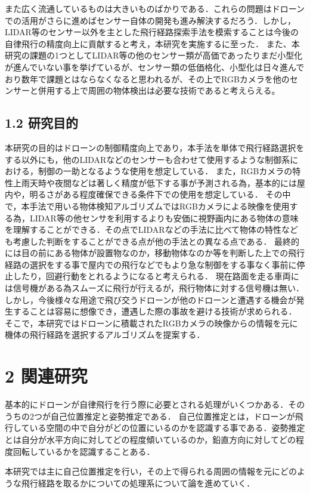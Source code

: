 \documentclass[a4j,10pt]{jsarticle}
\begin{document}
また広く流通しているものは大きいものばかりである．これらの問題はドローンでの活用がさらに進めばセンサー自体の開発も進み解決するだろう．しかし，LIDAR等のセンサー以外を主とした飛行経路探索手法を模索することは今後の自律飛行の精度向上に貢献すると考え，本研究を実施するに至った．
また、本研究の課題の1つとしてLIDAR等の他のセンサー類が高価であったりまだ小型化が進んでいない事を挙げているが、センサー類の低価格化、小型化は日々進んでおり数年で課題とはならなくなると思われるが、その上でRGBカメラを他のセンサーと併用する上で周囲の物体検出は必要な技術であると考えらえる。


\subsection{1.2 研究目的}
本研究の目的はドローンの制御精度向上であり，本手法を単体で飛行経路選択をする以外にも，他のLIDARなどのセンサーも合わせて使用するような制御系における，制御の一助となるような使用を想定している．
また，RGBカメラの特性上雨天時や夜間などは著しく精度が低下する事が予測される為，基本的には屋内や，明るさがある程度確保できる条件下での使用を想定している．
その中で，本手法で用いる物体検知アルゴリズムではRGBカメラによる映像を使用する為，LIDAR等の他センサを利用するよりも安価に視野画内にある物体の意味を理解することができる．その点でLIDARなどの手法に比べて物体の特性なども考慮した判断をすることができる点が他の手法との異なる点である．
最終的には目の前にある物体が設置物なのか，移動物体なのか等を判断した上での飛行経路の選択をする事で屋内での飛行などでもより急な制御をする事なく事前に停止したり，回避行動をとれるようになると考えられる．
現在路面を走る車両には信号機がある為スムーズに飛行が行えるが，飛行物体に対する信号機は無い．しかし，今後様々な用途で飛び交うドローンが他のドローンと遭遇する機会が発生することは容易に想像でき，遭遇した際の事故を避ける技術が求められる．
そこで，本研究ではドローンに積載されたRGBカメラの映像からの情報を元に機体の飛行経路を選択するアルゴリズムを提案する．

\section{2 関連研究}
基本的にドローンが自律飛行を行う際に必要とされる処理がいくつかある．そのうちの2つが自己位置推定と姿勢推定である．
自己位置推定とは，ドローンが飛行している空間の中で自分がどの位置にいるのかを認識する事である．姿勢推定とは自分が水平方向に対してどの程度傾いているのか，鉛直方向に対してどの程度回転しているかを認識することある．

本研究では主に自己位置推定を行い，その上で得られる周囲の情報を元にどのような飛行経路を取るかについての処理系について論を進めていく．
\end{document}
